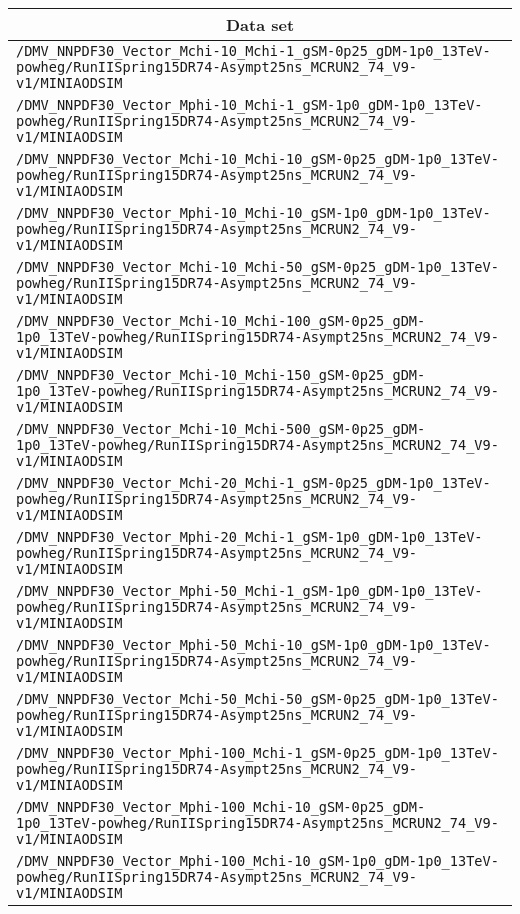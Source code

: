 \begin{center}
\begin{tabular}{l}
\hline\hline
\multicolumn{1}{c}{Data set}\tabularnewline
\hline
\verb!/DMV_NNPDF30_Vector_Mchi-10_Mchi-1_gSM-0p25_gDM-1p0_13TeV-powheg/RunIISpring15DR74-Asympt25ns_MCRUN2_74_V9-v1/MINIAODSIM! \tabularnewline
\verb!/DMV_NNPDF30_Vector_Mphi-10_Mchi-1_gSM-1p0_gDM-1p0_13TeV-powheg/RunIISpring15DR74-Asympt25ns_MCRUN2_74_V9-v1/MINIAODSIM! \tabularnewline
\verb!/DMV_NNPDF30_Vector_Mchi-10_Mchi-10_gSM-0p25_gDM-1p0_13TeV-powheg/RunIISpring15DR74-Asympt25ns_MCRUN2_74_V9-v1/MINIAODSIM! \tabularnewline
\verb!/DMV_NNPDF30_Vector_Mphi-10_Mchi-10_gSM-1p0_gDM-1p0_13TeV-powheg/RunIISpring15DR74-Asympt25ns_MCRUN2_74_V9-v1/MINIAODSIM! \tabularnewline
\verb!/DMV_NNPDF30_Vector_Mchi-10_Mchi-50_gSM-0p25_gDM-1p0_13TeV-powheg/RunIISpring15DR74-Asympt25ns_MCRUN2_74_V9-v1/MINIAODSIM! \tabularnewline
\verb!/DMV_NNPDF30_Vector_Mchi-10_Mchi-100_gSM-0p25_gDM-1p0_13TeV-powheg/RunIISpring15DR74-Asympt25ns_MCRUN2_74_V9-v1/MINIAODSIM! \tabularnewline
\verb!/DMV_NNPDF30_Vector_Mchi-10_Mchi-150_gSM-0p25_gDM-1p0_13TeV-powheg/RunIISpring15DR74-Asympt25ns_MCRUN2_74_V9-v1/MINIAODSIM! \tabularnewline
\verb!/DMV_NNPDF30_Vector_Mchi-10_Mchi-500_gSM-0p25_gDM-1p0_13TeV-powheg/RunIISpring15DR74-Asympt25ns_MCRUN2_74_V9-v1/MINIAODSIM! \tabularnewline
\verb!/DMV_NNPDF30_Vector_Mchi-20_Mchi-1_gSM-0p25_gDM-1p0_13TeV-powheg/RunIISpring15DR74-Asympt25ns_MCRUN2_74_V9-v1/MINIAODSIM! \tabularnewline
\verb!/DMV_NNPDF30_Vector_Mphi-20_Mchi-1_gSM-1p0_gDM-1p0_13TeV-powheg/RunIISpring15DR74-Asympt25ns_MCRUN2_74_V9-v1/MINIAODSIM! \tabularnewline
\verb!/DMV_NNPDF30_Vector_Mphi-50_Mchi-1_gSM-1p0_gDM-1p0_13TeV-powheg/RunIISpring15DR74-Asympt25ns_MCRUN2_74_V9-v1/MINIAODSIM! \tabularnewline
\verb!/DMV_NNPDF30_Vector_Mphi-50_Mchi-10_gSM-1p0_gDM-1p0_13TeV-powheg/RunIISpring15DR74-Asympt25ns_MCRUN2_74_V9-v1/MINIAODSIM! \tabularnewline
\verb!/DMV_NNPDF30_Vector_Mchi-50_Mchi-50_gSM-0p25_gDM-1p0_13TeV-powheg/RunIISpring15DR74-Asympt25ns_MCRUN2_74_V9-v1/MINIAODSIM! \tabularnewline
\verb!/DMV_NNPDF30_Vector_Mphi-100_Mchi-1_gSM-0p25_gDM-1p0_13TeV-powheg/RunIISpring15DR74-Asympt25ns_MCRUN2_74_V9-v1/MINIAODSIM! \tabularnewline
\verb!/DMV_NNPDF30_Vector_Mphi-100_Mchi-10_gSM-0p25_gDM-1p0_13TeV-powheg/RunIISpring15DR74-Asympt25ns_MCRUN2_74_V9-v1/MINIAODSIM! \tabularnewline
\verb!/DMV_NNPDF30_Vector_Mphi-100_Mchi-10_gSM-1p0_gDM-1p0_13TeV-powheg/RunIISpring15DR74-Asympt25ns_MCRUN2_74_V9-v1/MINIAODSIM! \tabularnewline

\end{tabular}
\end{center}
